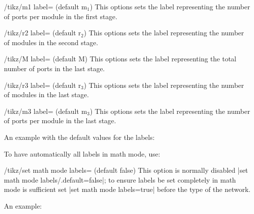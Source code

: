 \documentclass{ltxdoc}
\begin{document}
\begin{key}{/tikz/m1 label= (default m$_1$)}
    This options sets the label representing the number of ports per module in the first stage.
\end{key}

\begin{key}{/tikz/r2 label= (default r$_2$)}
    This options sets the label representing the number of modules in the second stage.
\end{key}

\begin{key}{/tikz/M label= (default M)}
    This options sets the label representing the total number of ports in the last stage.
\end{key}

\begin{key}{/tikz/r3 label= (default r$_3$)}
    This options sets the label representing the number of modules in the last stage.
\end{key}

\begin{key}{/tikz/m3 label= (default m$_3$)}
    This options sets the label representing the number of ports per module in the last stage.
\end{key}

An example with the default values for the labels:

\begin{codeexample}[]
\end{codeexample}

To have automatically all labels in math mode, use:
\begin{key}{/tikz/set math mode labels= (default false)}
	This option is normally disabled |set math mode labels/.default=false|; to ensure labels be set completely in math mode is sufficient set |set math mode labels=true| before the type of the network.
\end{key}

An example:
\begin{codeexample}[]
\end{codeexample}
\end{document}
